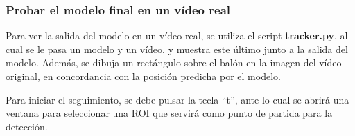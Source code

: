 \subsubsection*{Probar el modelo final en un vídeo real}

Para ver la salida del modelo en un vídeo real, se utiliza el script \textbf{tracker.py}, al cual se le pasa un modelo y un vídeo, y muestra este último junto a la salida del modelo. Además, se dibuja un rectángulo sobre el balón en la imagen del vídeo original, en concordancia con la posición predicha por el modelo.

Para iniciar el seguimiento, se debe pulsar la tecla ``t'', ante lo cual se abrirá una ventana para seleccionar una ROI que servirá como punto de partida para la detección.

\newpage